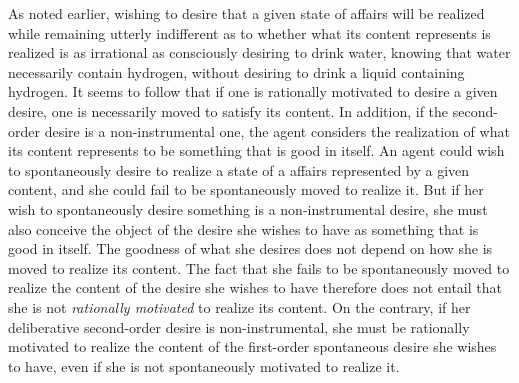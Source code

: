 \documentclass[output=paper,colorlinks,citecolor=brown
]{langscibook}
\begin{document}
As noted earlier, wishing to desire that a given state of affairs will be realized while remaining utterly indifferent as to whether what its content represents is realized is as irrational as consciously desiring to drink water, knowing that water necessarily contain hydrogen, without desiring to drink a liquid containing hydrogen. It seems to follow that if one is rationally motivated to desire a given desire, one is necessarily moved to satisfy its content. In addition, if the second-order desire is a non-instrumental one, the agent considers the realization of what its content represents to be something that is good in itself. An agent could wish to spontaneously desire to realize a state of a affairs represented by a given content, and she could fail to be spontaneously moved to realize it. But if her wish to spontaneously desire something is a non-instrumental desire, she must also conceive the object of the desire she wishes to have as something that is good in itself. The goodness of what she desires does not depend on how she is moved to realize its content. The fact that she fails to be spontaneously moved to realize the content of the desire she wishes to have therefore does not entail that she is not \textit{rationally motivated} to realize its content. On the contrary, if her deliberative second-order desire is non-instrumental, she must be rationally motivated to realize the content of the first-order spontaneous desire she wishes to have, even if she is not spontaneously motivated to realize it. 
\end{document}

